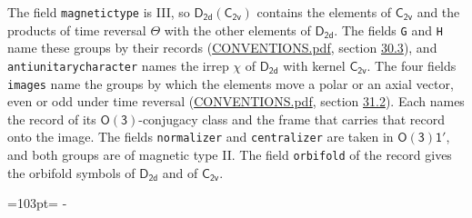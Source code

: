 \documentclass[10pt,a4paper]{article}
\newcommand{\needspace}[1]{\par\penalty-100\begingroup\dimen0=#1\relax\dimen2=\pagegoal
  \advance\dimen2-\pagetotal\ifdim\dimen0>\dimen2\relax\ifdim\dimen2>0pt\vfil\break\fi\fi
  \endgroup}
\numberwithin{equation}{section}
\newcommand{\grp}[1]{\mathsf{#1}}
\begin{document}
The field \texttt{magnetictype} is III, so $\grp{D_{2d}}(\grp{C_{2v}})$ contains the elements of $\grp{C_{2v}}$ and the products of time reversal $\varTheta$ with the other elements of $\grp{D_{2d}}$. The fields \texttt{G} and \texttt{H} name these groups by their records (\href{../../CONVENTIONS.pdf}{CONVENTIONS.pdf}, section \href{../../CONVENTIONS.pdf\#conv.30.3}{30.3}), and \texttt{antiunitarycharacter} names the irrep $\chi$ of $\grp{D_{2d}}$ with kernel $\grp{C_{2v}}$. The four fields \texttt{images} name the groups by which the elements move a polar or an axial vector, even or odd under time reversal (\href{../../CONVENTIONS.pdf}{CONVENTIONS.pdf}, section \href{../../CONVENTIONS.pdf\#conv.31.2}{31.2}). Each names the record of its $\grp{O(3)}$-conjugacy class and the frame that carries that record onto the image. The fields \texttt{normalizer} and \texttt{centralizer} are taken in $\grp{O(3)1'}$, and both groups are of magnetic type II. The field \texttt{orbifold} of the record gives the orbifold symbols of $\grp{D_{2d}}$ and of $\grp{C_{2v}}$.
\needspace{103pt}
\end{document}
